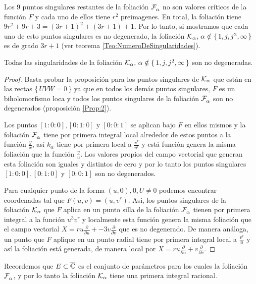 Los 9 puntos singulares restantes de la foliación $\mathcal{F}^{\ }_{\alpha}$ no son valores críticos de la función $F$ y cada uno de ellos tiene $r^{2}$ preimagenes. En total, la foliación tiene $9r^{2}+9r+3=(3r+1)^{2}+(3r+1)+1$. Por lo tanto, si mostramos que cada uno de esto puntos singulares es no degenerado, la foliación $\mathcal{K}_{\alpha},\, \alpha\notin\{\, 1,j,j^{2},\infty\, \}$ es de grado $3r+1$ (ver teorema \ref{Teo:NumeroDeSingularidades}).

\begin{Proposicion}
\label{Prop:SingularidadesK}
Todas las singularidades de la foliación $\mathcal{K}_{\alpha},\, \alpha\notin\{\, 1,j,j^{2},\infty\, \}$ son no degeneradas.
\end{Proposicion}
\begin{proof}
Basta probar la proposición para los puntos singulares de $\mathcal{K}_{\alpha}$ que están en las rectas $\{\,  UVW=0\,\}$ ya que en todos los demás puntos singulares, $F$ es un biholomorfismo loca y todos los puntos singulares de la foliación $\mathcal{F}^{\ }_{\alpha}$ son no degenerados (proposición \ref{Prop:2}).

Los puntos $[1:0:0],[0:1:0]$ y $[0:0:1]$ se aplican bajo $F$ en ellos mismos y la foliación $\mathcal{F}^{\ }_{\alpha}$ tiene por primera integral local alrededor de estos puntos a la función $\tfrac{y}{x}$, así $k_{\alpha}$ tiene por primera local a $\tfrac{v^{r}}{u^{r}}$ y está función genera la misma foliación que la función $\tfrac{v}{u}$. Los valores propios del campo vectorial que generan esta foliación son iguales y distintos de cero y por lo tanto los puntos singulares $[1:0:0],[0:1:0]$ y $[0:0:1]$ son no degenerados.

Para cualquier punto de la forma $(u,0),0, U\neq 0$ podemos encontrar coordenadas tal que $F(u,v)=(u,v^{r})$. Así, los puntos singulares de la foliación $\mathcal{K}_{\alpha}$ que $F$ aplica en un punto silla de la foliación $\mathcal{F}^{\ }_{\alpha}$ tienen por primera integral a la función $u^{3}v^{r}$ y localmente esta función genera la misma foliación que el campo vectorial $X=ru\tfrac{\partial}{\partial u}+-3v\tfrac{\partial}{\partial v}$ que es no degenerado. De manera análoga, un punto que $F$ aplique en un punto radial tiene por primera integral local a $\tfrac{v^{r}}{u}$ y así la foliación está generada, de manera local por $X=ru\tfrac{\partial}{\partial u}+ v\tfrac{\partial}{\partial v}$. 
\end{proof}

Recordemos que $E\subset\overline{\mathbb{C}}$ es el conjunto de parámetros para los cuales la foliación $\mathcal{F}^{\ }_{\alpha}$, y por lo tanto la foliación $\mathcal{K}_{\alpha}$ tiene una primera integral racional.

